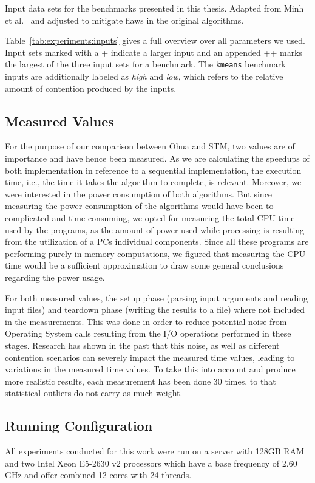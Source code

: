 \begin{table}
    \caption{Input data sets for the benchmarks presented in this thesis. Adapted from Minh et al.~\cite{minh2008stamp} and adjusted to mitigate flaws in the original algorithms.}
    \label{tab:experiments:inputs}
\end{table}

Table~\ref{tab:experiments:inputs} gives a full overview over all parameters we used.
Input sets marked with a + indicate a larger input and an appended ++ marks the largest of the three input sets for a benchmark.
The \texttt{kmeans} benchmark inputs are additionally labeled as \emph{high} and \emph{low}, which refers to the relative amount of contention produced by the inputs.

\subsection{Measured Values}
\label{sec:experiments:measurements:values}

For the purpose of our comparison between Ohua and STM, two values are of importance and have hence been measured.
As we are calculating the speedups of both implementation in reference to a sequential implementation, the execution time, i.e., the time it takes the algorithm to complete, is relevant.
Moreover, we were interested in the power consumption of both algorithms.
But since measuring the power consumption of the algorithms would have been to complicated and time-consuming, we opted for measuring the total CPU time used by the programs, as the amount of power used while processing is resulting from the utilization of a PCs individual components.
Since all these programs are performing purely in-memory computations, we figured that measuring the CPU time would be a sufficient approximation to draw some general conclusions regarding the power usage.

For both measured values, the setup phase (parsing input arguments and reading input files) and teardown phase (writing the results to a file) where not included in the measurements.
This was done in order to reduce potential noise from Operating System calls resulting from the I/O operations performed in these stages.
Research has shown in the past that this noise, as well as different contention scenarios can severely impact the measured time values, leading to variations in the measured time values.
To take this into account and produce more realistic results, each measurement has been done 30 times, to that statistical outliers do not carry as much weight.

\subsection{Running Configuration}
\label{sec:experiments:measurements:hardware}

All experiments conducted for this work were run on a server with 128GB RAM and two Intel Xeon E5-2630 v2 processors which have a base frequency of 2.60 GHz and offer combined 12 cores with 24 threads.

